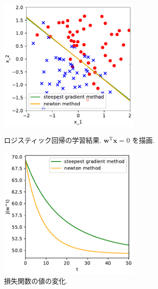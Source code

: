 \documentclass[a4paper,10pt]{jsarticle}
\begin{document}
\begin{figure}[htbp]
 \begin{minipage}{0.5\hsize}
  \begin{center}
   \includegraphics[width=7cm]{figs/p1_logistic-regression_result.pdf}
  \end{center}
  \caption{ロジスティック回帰の学習結果. $\bm{w}^\mathrm{T}\bm{x}=0$ を描画.}
  \label{img:log-result}
 \end{minipage}
 \begin{minipage}{0.5\hsize}
  \begin{center}
   \includegraphics[width=7cm]{figs/p1_logistic-regression_loss.pdf}
  \end{center}
  \caption{損失関数の値の変化.}
  \label{img:log-loss}
 \end{minipage}
\end{figure}
\end{document}
